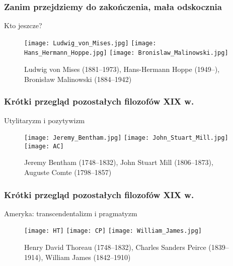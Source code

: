 \documentclass{beamer}  %
\begin{document}
\begin{frame}
  \frametitle{Zanim przejdziemy do zakończenia, mała odskocznia}

  \begin{block}{Kto jeszcze?}
    \begin{figure}
      \centering

      \texttt{[image: Ludwig\_von\_Mises.jpg]}
      \texttt{[image: Hans\_Hermann\_Hoppe.jpg]}
      \texttt{[image: Bronislaw\_Malinowski.jpg]}
      \caption{Ludwig von Mises (1881--1973),
          Hans-Hermann Hoppe \newline (1949--), Bronisław Malinowski
          (1884--1942)}
    \end{figure}
  \end{block}
\end{frame}



\begin{frame}
  \frametitle{Krótki przegląd pozostałych filozofów XIX w.}

  \begin{block}{Utylitaryzm i pozytywizm}
    \begin{figure}
      \centering

      \texttt{[image: Jeremy\_Bentham.jpg]}
      \texttt{[image: John\_Stuart\_Mill.jpg]}
      \texttt{[image: AC]}
      \caption{Jeremy Bentham (1748--1832), John Stuart Mill
        (1806--1873), Auguste Comte (1798--1857)}
    \end{figure}
  \end{block}

\end{frame}



\begin{frame}
  \frametitle{Krótki przegląd pozostałych filozofów XIX w.}
  \begin{block}{Ameryka: transcendentalizm i pragmatyzm}
    \begin{figure}
      \centering \texttt{[image: HT]}
      \texttt{[image: CP]}
      \texttt{[image: William\_James.jpg]}
      \caption{Henry David Thoreau (1748--1832), Charles Sanders
        Peirce (1839--1914), William James (1842--1910)}
    \end{figure}
  \end{block}

\end{frame}
\end{document}
